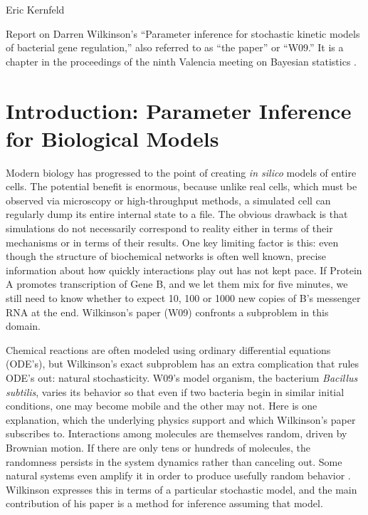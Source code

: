 \documentclass{article}
\begin{document}
Eric Kernfeld

Report on Darren Wilkinson's ``Parameter inference for stochastic kinetic models of bacterial gene regulation,'' also referred to as ``the paper'' or ``W09.'' It is a chapter in the proceedings of the ninth Valencia meeting on Bayesian statistics \cite{Bernardo2012}. 

\begin{abstract}

\end{abstract}


\section{Introduction: Parameter Inference for Biological Models}

Modern biology has progressed to the point of creating {\it in silico} models of entire cells. The potential benefit is enormous, because unlike real cells, which must be observed via microscopy or high-throughput methods, a simulated cell can regularly dump its entire internal state to a file. The obvious drawback is that simulations do not necessarily correspond to reality either in terms of their mechanisms or in terms of their results. One key limiting factor is this: even though the structure of biochemical networks is often well known, precise information about how quickly interactions play out has not kept pace. If Protein A promotes transcription of Gene B, and we let them mix for five minutes, we still need to know whether to expect 10, 100 or 1000 new copies of B's messenger RNA at the end. Wilkinson's paper (W09) confronts a subproblem in this domain.

Chemical reactions are often modeled using ordinary differential equations (ODE's), but Wilkinson's exact subproblem has an extra complication that rules ODE's out: natural stochasticity. W09's model organism, the bacterium {\it Bacillus subtilis}, varies its behavior so that even if two bacteria begin in similar initial conditions, one may become mobile and the other may not. Here is one explanation, which the underlying physics support and which  Wilkinson's paper subscribes to. Interactions among molecules are themselves random, driven by Brownian motion. If there are only tens or hundreds of molecules, the randomness persists in the system dynamics rather than canceling out. Some natural systems even amplify it in order to produce usefully random behavior \cite{reinker2006parameter}. Wilkinson expresses this in terms of a particular stochastic model, and the main contribution of his paper is a method for inference assuming that model.
 
\end{document}
